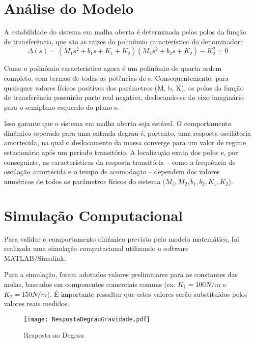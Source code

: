 \documentclass[9pt,a4paper,twocolumn,twoside]{tau-class/tau}
\begin{document}

\section{Análise do Modelo}

A estabilidade do sistema em malha aberta é determinada pelos polos da função de transferência, que são as raizes do polinômio característico do denominador:
\begin{equation}
    \Delta (s) = (M_1s^2 + b_1s + K_1 + K_2)(M_2s^2 + b_2s + K_2) - K_2^2 = 0
\label{eq:raizes}
\end{equation}

Como o polinômio característico agora é um polinômio de quarta ordem completo, com termos de todas as potências de s. Consequentemente, para quaisquer valores físicos positivos dos parâmetros (M, b, K), os polos da função de transferência possuirão parte real negativa, deslocando-se do eixo imaginário para o semiplano esquerdo do plano s.

Isso garante que o sistema em malha aberta seja estável. O comportamento dinâmico esperado para uma entrada degrau é, portanto, uma resposta oscilátoria amortecida, na qual o deslocamento da massa converge para um valor de regime estacionário após um período transitório. A localização exata dos polos e, por conseguinte, as características da resposta transitória -- como a frequência de oscilação amortecida e o tempo de acomodação -- dependem dos valores numéricos de todos os parâmetros físicos do sistema ($M_1, M_2, b_1, b_2, K_1, K_2$).

\section{Simulação Computacional}

Para validar o comportamento dinâmico previsto pelo modelo matemático, foi realizada uma simulação computacional utilizando o software MATLAB/Simulink.

Para a simulação, foram adotados valores preliminares para as constantes das molas, baseados em componentes comerciais comuns (ex: $K_1 = 100N/m$ e $K_2 = 150N/m$). É importante ressaltar que estes valores serão substituídos pelos valores reais medidos.

\begin{figure}[H]
    \centering
    \texttt{[image: RespostaDegrauGravidade.pdf]}
    \caption{Resposta ao Degrau}
    \label{fig:RDG}
\end{figure}
\end{document}
